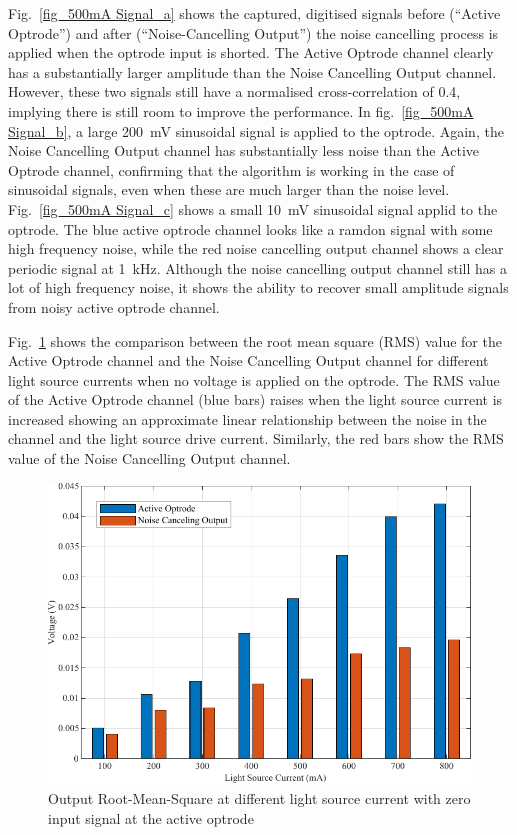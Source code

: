 Fig.~\ref{fig_500mA Signal_a} shows the captured, digitised signals before (``Active Optrode'') and after (``Noise-Cancelling Output'') the noise cancelling process is applied when the optrode input is shorted.  The Active Optrode channel clearly has a substantially larger amplitude than the Noise Cancelling Output channel.  However, these two signals still have a normalised cross-correlation of 0.4, implying there is still room to improve the performance. In fig.~\ref{fig_500mA Signal_b}, a large \qty{200}{mV} sinusoidal signal is applied to the optrode.  Again, the Noise Cancelling Output channel has substantially less noise than the Active Optrode channel, confirming that the algorithm is working in the case of sinusoidal signals, even when these are much larger than the noise level.  Fig.~\ref{fig_500mA Signal_c} shows a small \qty{10}{mV} sinusoidal signal applid to the optrode.  The blue active optrode channel looks like a ramdon signal with some high frequency noise, while the red noise cancelling output channel shows a clear periodic signal at \qty{1}{kHz}.  Although the noise cancelling output channel still has a lot of high frequency noise, it shows the ability to recover small amplitude signals from noisy active optrode channel.

Fig.~\ref{fig_RMS value for ch1 and DSP output} shows the comparison between the root mean square (RMS) value for the Active Optrode channel and the Noise Cancelling Output channel for different light source currents when no voltage is applied on the optrode.  The RMS value of the Active Optrode channel (blue bars) raises when the light source current is increased showing an approximate linear relationship between the noise in the channel and the light source drive current. Similarly, the red bars show the RMS value of the Noise Cancelling Output channel. 

\begin{figure}[h]
\centerline{\includegraphics[scale=1]{5-Experiment/RMS value for ch1 and DSP output.pdf}}
\caption{Output Root-Mean-Square at different light source current with zero input signal at the active optrode}
\label{fig_RMS value for ch1 and DSP output}
\end{figure}


